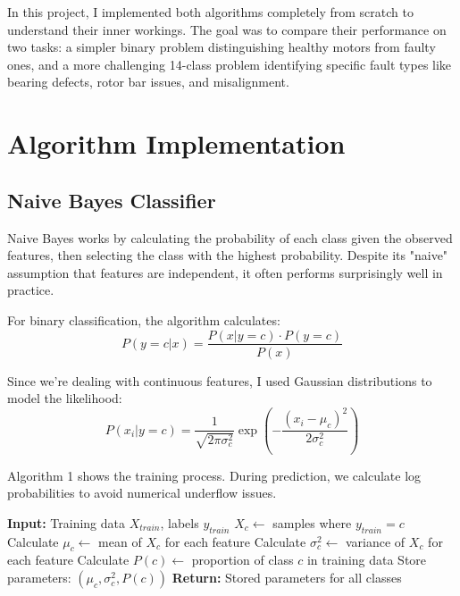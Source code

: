 \documentclass[conference]{IEEEtran}
\begin{document}
In this project, I implemented both algorithms completely from scratch to understand their inner workings. The goal was to compare their performance on two tasks: a simpler binary problem distinguishing healthy motors from faulty ones, and a more challenging 14-class problem identifying specific fault types like bearing defects, rotor bar issues, and misalignment.

\section{Algorithm Implementation}

\subsection{Naive Bayes Classifier}
Naive Bayes works by calculating the probability of each class given the observed features, then selecting the class with the highest probability. Despite its "naive" assumption that features are independent, it often performs surprisingly well in practice.

For binary classification, the algorithm calculates:
\begin{equation}
P(y=c|x) = \frac{P(x|y=c) \cdot P(y=c)}{P(x)}
\end{equation}

Since we're dealing with continuous features, I used Gaussian distributions to model the likelihood:
\begin{equation}
P(x_i|y=c) = \frac{1}{\sqrt{2\pi\sigma_c^2}} \exp\left(-\frac{(x_i-\mu_c)^2}{2\sigma_c^2}\right)
\end{equation}

Algorithm 1 shows the training process. During prediction, we calculate log probabilities to avoid numerical underflow issues.

\begin{algorithm}
\caption{Naive Bayes Training}
\begin{algorithmic}[1]
\STATE \textbf{Input:} Training data $X_{train}$, labels $y_{train}$
\STATE $X_c \gets$ samples where $y_{train} = c$
\STATE Calculate $\mu_c \gets$ mean of $X_c$ for each feature
\STATE Calculate $\sigma_c^2 \gets$ variance of $X_c$ for each feature
\STATE Calculate $P(c) \gets$ proportion of class $c$ in training data
\STATE Store parameters: $(\mu_c, \sigma_c^2, P(c))$
\ENDFOR
\STATE \textbf{Return:} Stored parameters for all classes
\end{algorithmic}
\end{algorithm}
\end{document}
